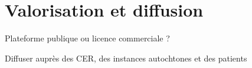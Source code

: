 \section{Valorisation et diffusion}

\begin{frame}{Plateforme publique ou licence commerciale ?}
\end{frame}

\begin{frame}{Diffuser auprès des CER, des instances autochtones et des patients}
\end{frame}

